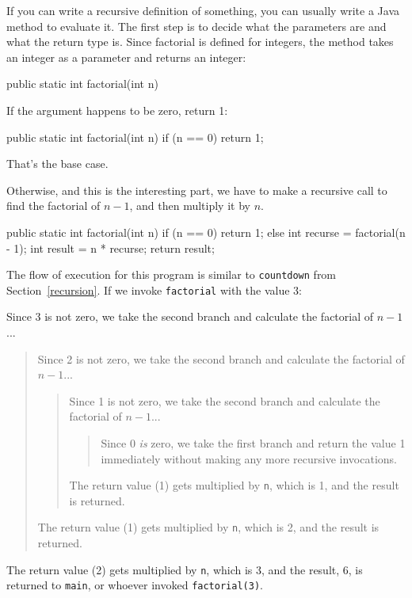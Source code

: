 \documentclass[12pt]{book}
\theoremstyle{exercise}
\begin{document}
If you can write a recursive definition of something, you can usually write a Java method to evaluate it.
The first step is to decide what the parameters are and what the return type is.
Since factorial is defined for integers, the method takes an integer as a parameter and returns an integer:

\begin{code}
    public static int factorial(int n) {
    }
\end{code}

If the argument happens to be zero, return 1:

\begin{code}
    public static int factorial(int n) {
        if (n == 0) {
            return 1;
        }
    }
\end{code}

That's the base case.

Otherwise, and this is the interesting part, we have to make a recursive call to find the factorial of $n-1$, and then multiply it by $n$.

\begin{code}
    public static int factorial(int n) {
        if (n == 0) {
            return 1;
        } else {
            int recurse = factorial(n - 1);
            int result = n * recurse;
            return result;
        }
    }
\end{code}

The flow of execution for this program is similar to {\tt countdown} from Section~\ref{recursion}.
If we invoke {\tt factorial} with the value 3:

Since 3 is not zero, we take the second branch and calculate the factorial of $n-1$...
\begin{quote}
Since 2 is not zero, we take the second branch and calculate the factorial of $n-1$...
\begin{quote}
Since 1 is not zero, we take the second branch and calculate the factorial of $n-1$...
\begin{quote}
Since 0 {\em is} zero, we take the first branch and return the value 1 immediately without making any more recursive invocations.
\end{quote}
The return value (1) gets multiplied by {\tt n}, which is 1, and the result is returned.
\end{quote}
The return value (1) gets multiplied by {\tt n}, which is 2, and the result is returned.
\end{quote}
The return value (2) gets multiplied by {\tt n}, which is 3, and the result, 6, is returned to {\tt main}, or whoever invoked {\tt factorial(3)}.
\end{document}
